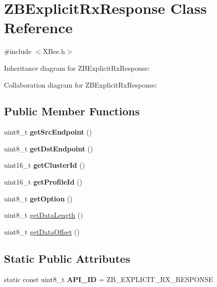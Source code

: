 \hypertarget{class_z_b_explicit_rx_response}{}\section{Z\+B\+Explicit\+Rx\+Response Class Reference}
\label{class_z_b_explicit_rx_response}


{\ttfamily \#include $<$X\+Bee.\+h$>$}



Inheritance diagram for Z\+B\+Explicit\+Rx\+Response\+:


Collaboration diagram for Z\+B\+Explicit\+Rx\+Response\+:
\subsection*{Public Member Functions}
\begin{DoxyCompactItemize}
\item 
\hypertarget{class_z_b_explicit_rx_response_a60c762f7577fde5bafd1fa8301221aab}{}\label{class_z_b_explicit_rx_response_a60c762f7577fde5bafd1fa8301221aab} 
uint8\+\_\+t {\bfseries get\+Src\+Endpoint} ()
\item 
\hypertarget{class_z_b_explicit_rx_response_a2d8cee53fe0efd60c22144d076dfe3d1}{}\label{class_z_b_explicit_rx_response_a2d8cee53fe0efd60c22144d076dfe3d1} 
uint8\+\_\+t {\bfseries get\+Dst\+Endpoint} ()
\item 
\hypertarget{class_z_b_explicit_rx_response_a8010d8d76158a743496c08ecf0de4b4b}{}\label{class_z_b_explicit_rx_response_a8010d8d76158a743496c08ecf0de4b4b} 
uint16\+\_\+t {\bfseries get\+Cluster\+Id} ()
\item 
\hypertarget{class_z_b_explicit_rx_response_a42a57794f31d532fce3380f8564143a1}{}\label{class_z_b_explicit_rx_response_a42a57794f31d532fce3380f8564143a1} 
uint16\+\_\+t {\bfseries get\+Profile\+Id} ()
\item 
\hypertarget{class_z_b_explicit_rx_response_ad5483f4ff70821a8bf46421c4997ce76}{}\label{class_z_b_explicit_rx_response_ad5483f4ff70821a8bf46421c4997ce76} 
uint8\+\_\+t {\bfseries get\+Option} ()
\item 
uint8\+\_\+t \hyperlink{class_z_b_explicit_rx_response_af0f29cd6d76215f50224547ef8201cb7}{get\+Data\+Length} ()
\item 
uint8\+\_\+t \hyperlink{class_z_b_explicit_rx_response_aac859574ace86ba08f6abb9d865fec17}{get\+Data\+Offset} ()
\end{DoxyCompactItemize}
\subsection*{Static Public Attributes}
\begin{DoxyCompactItemize}
\item 
\hypertarget{class_z_b_explicit_rx_response_a9a8ad6e291a04ba689472439e682f079}{}\label{class_z_b_explicit_rx_response_a9a8ad6e291a04ba689472439e682f079} 
static const uint8\+\_\+t {\bfseries A\+P\+I\+\_\+\+ID} = Z\+B\+\_\+\+E\+X\+P\+L\+I\+C\+I\+T\+\_\+\+R\+X\+\_\+\+R\+E\+S\+P\+O\+N\+SE
\end{DoxyCompactItemize}
